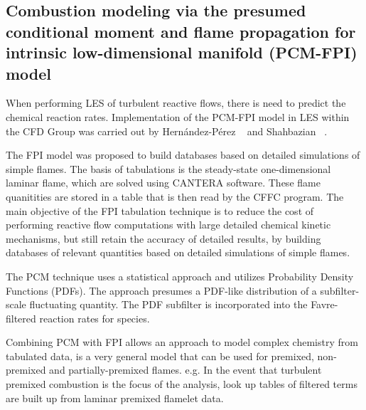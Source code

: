 \subsection{Combustion modeling via the presumed conditional moment and flame propagation for intrinsic low-dimensional manifold (PCM-FPI) model}

When performing LES of turbulent reactive flows, there is need to predict the chemical reaction rates. Implementation of the PCM-FPI model in LES within the CFD Group was carried out by Hern{\'a}ndez-P{\'e}rez ~\cite{HPerez:2011} and Shahbazian \etal ~\cite{Shahbazian:2011}.\par

The FPI model was proposed to build databases based on detailed simulations of simple flames. The basis of tabulations is the steady-state one-dimensional laminar flame, which are solved using CANTERA software. These flame quanitities are stored in a table that is then read by the CFFC program. The main objective of the FPI tabulation technique is to reduce the cost of performing reactive
flow computations with large detailed chemical kinetic mechanisms, but still retain the accuracy of detailed results, by building databases of relevant quantities based on detailed simulations of simple flames. ~\cite{HPerez:2011} \par

The PCM technique uses a statistical approach and utilizes Probability Density Functions (PDFs). The approach presumes a PDF-like distribution of a subfilter-scale fluctuating quantity. The PDF subfilter is incorporated into the Favre-filtered reaction rates for species.\par

Combining PCM with FPI allows an approach to model complex chemistry from tabulated data, is a very general model that can be used for premixed, non-premixed and partially-premixed flames. e.g. In the event that turbulent premixed combustion is the focus of the analysis, look up tables of filtered terms are built up from laminar premixed flamelet data.\par

